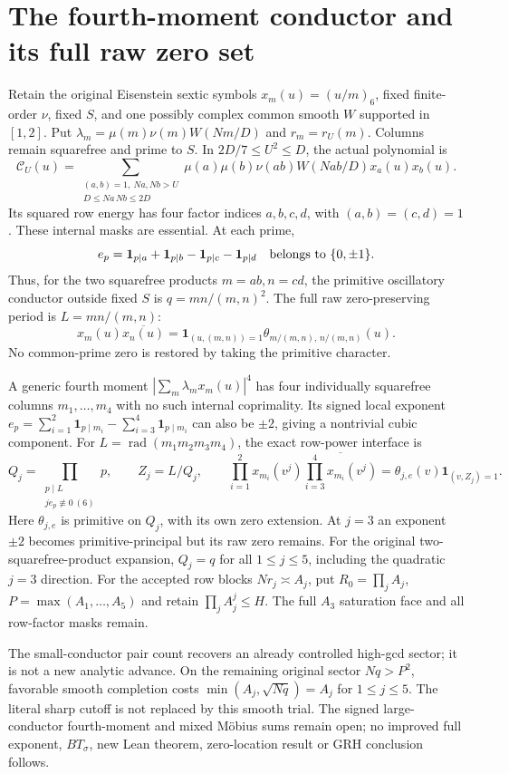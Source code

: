 \documentclass[11pt]{article}
\theoremstyle{definition}\newtheorem{definition}[theorem]{Definition}
\theoremstyle{remark}\newtheorem{remark}[theorem]{Remark}
\begin{document}
\section{The fourth-moment conductor and its full raw zero set}
\label{upq:core}
Retain the original Eisenstein sextic symbols $x_m(u)=(u/m)_6$,
fixed finite-order $\nu$, fixed $S$, and one possibly complex common
smooth $W$ supported in $[1,2]$. Put
$\lambda_m=\mu(m)\nu(m)W(Nm/D)$ and $r_m=r_U(m)$.
Columns remain squarefree and prime to $S$. In $2D/7\le U^2\le D$, the actual polynomial is
\[
 \mathcal C_U(u)=
 \sum_{\substack{(a,b)=1,\ Na,Nb>U\\D\le Na\,Nb\le2D}}
 \mu(a)\mu(b)\nu(ab)W(Nab/D)x_a(u)x_b(u).
\]
Its squared row energy has four factor indices $a,b,c,d$, with
$(a,b)=(c,d)=1$. These internal masks are essential. At each prime,
\[
 e_p=\mathbf1_{p\mid a}+\mathbf1_{p\mid b}
       -\mathbf1_{p\mid c}-\mathbf1_{p\mid d}
 \quad\hbox{belongs to }\{0,\pm1\}.
\]
Thus, for the two squarefree products $m=ab,n=cd$, the primitive
oscillatory conductor outside fixed $S$ is $q=mn/(m,n)^2$.
The full raw zero-preserving period is $L=mn/(m,n)$:
\[
 x_m(u)\overline{x_n(u)}
 =\mathbf1_{(u,(m,n))=1}\theta_{m/(m,n),\,n/(m,n)}(u).
\]
No common-prime zero is restored by taking the primitive character.

A generic fourth moment $|\sum_m\lambda_mx_m(u)|^4$ has four individually
squarefree columns $m_1,\ldots,m_4$ with no such internal coprimality.
Its signed local exponent
$e_p=\sum_{i=1}^2\mathbf1_{p\mid m_i}-\sum_{i=3}^4\mathbf1_{p\mid m_i}$
can also be $\pm2$, giving a nontrivial cubic component. For $L=\operatorname{rad}(m_1m_2m_3m_4)$, the exact row-power
interface is
\[
 Q_j=\prod_{\substack{p\mid L\\je_p\not\equiv0\ (6)}}p,\qquad
 Z_j=L/Q_j,\qquad
 \prod_{i=1}^2x_{m_i}(v^j)
       \overline{\prod_{i=3}^4x_{m_i}(v^j)}
 =\theta_{j,e}(v)\mathbf1_{(v,Z_j)=1}.
\]
Here $\theta_{j,e}$ is primitive on $Q_j$, with its own zero extension.
At $j=3$ an exponent $\pm2$ becomes primitive-principal but its raw
zero remains. For the original two-squarefree-product expansion,
$Q_j=q$ for all $1\le j\le5$, including the quadratic $j=3$ direction.
For the accepted row blocks $Nr_j\asymp A_j$, put
$R_0=\prod_jA_j$, $P=\max(A_1,\ldots,A_5)$ and retain
$\prod_jA_j^j\le H$. The full $A_3$ saturation face and all row-factor
masks remain.

The small-conductor pair count recovers an already controlled high-gcd
sector; it is not a new analytic advance. On the remaining original
sector $Nq>P^2$, favorable smooth completion
costs $\min(A_j,\sqrt{Nq})=A_j$ for $1\le j\le5$.
The literal sharp cutoff is not replaced by this smooth trial.
The signed large-conductor fourth-moment and mixed M\"obius sums remain
open; no improved full exponent, $BT_\sigma$, new Lean theorem,
zero-location result or GRH conclusion follows.
\end{document}
